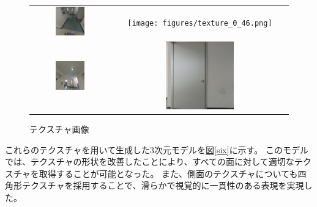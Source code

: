 \documentclass[]{jarticle}          %
\begin{document}
\begin{figure}[H]
  \begin{center}
    \begin{tabular}{cc}
      \includegraphics[width=0.4\textwidth]{figures/texture_0_6.png}&
      \texttt{[image: figures/texture\_0\_46.png]}\\
      \includegraphics[width=0.4\textwidth]{figures/texture_1_24.png}&
      \includegraphics[width=0.4\textwidth]{figures/texture_2_54.png}\\
    \end{tabular}
  \end{center}
  \caption{テクスチャ画像}
  \label{five}
\end{figure}

これらのテクスチャを用いて生成した3次元モデルを\hyperref[six]{図\ref{six}}に示す。
このモデルでは、テクスチャの形状を改善したことにより、すべての面に対して適切なテクスチャを取得することが可能となった。
また、側面のテクスチャについても四角形テクスチャを採用することで、滑らかで視覚的に一貫性のある表現を実現した。
\end{document}
